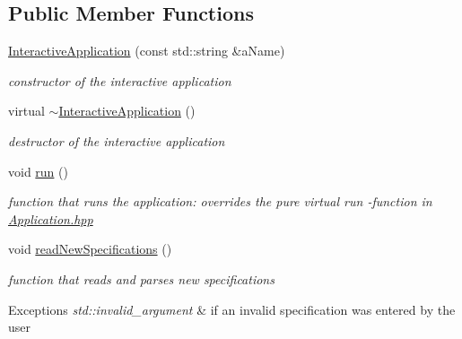 \subsection*{Public Member Functions}
\begin{DoxyCompactItemize}
\item 
\hyperlink{classInteractiveApplication_a400252d4a0553cc7fb85106106341fe9}{Interactive\+Application} (const std\+::string \&a\+Name)\hypertarget{classInteractiveApplication_a400252d4a0553cc7fb85106106341fe9}{}\label{classInteractiveApplication_a400252d4a0553cc7fb85106106341fe9}

\begin{DoxyCompactList}\small\item\em constructor of the interactive application \end{DoxyCompactList}\item 
virtual \hyperlink{classInteractiveApplication_adebc1def706d551144ab3f40511f85eb}{$\sim$\+Interactive\+Application} ()\hypertarget{classInteractiveApplication_adebc1def706d551144ab3f40511f85eb}{}\label{classInteractiveApplication_adebc1def706d551144ab3f40511f85eb}

\begin{DoxyCompactList}\small\item\em destructor of the interactive application \end{DoxyCompactList}\item 
void \hyperlink{classInteractiveApplication_ae77593fe90fa4fae53dc8ca84ba1a239}{run} ()\hypertarget{classInteractiveApplication_ae77593fe90fa4fae53dc8ca84ba1a239}{}\label{classInteractiveApplication_ae77593fe90fa4fae53dc8ca84ba1a239}

\begin{DoxyCompactList}\small\item\em function that runs the application\+: overrides the pure virtual run -\/function in \hyperlink{Application_8hpp_source}{Application.\+hpp} \end{DoxyCompactList}\item 
void \hyperlink{classInteractiveApplication_a8fb03895eb606ec5b984b5f0d10aca53}{read\+New\+Specifications} ()\hypertarget{classInteractiveApplication_a8fb03895eb606ec5b984b5f0d10aca53}{}\label{classInteractiveApplication_a8fb03895eb606ec5b984b5f0d10aca53}

\begin{DoxyCompactList}\small\item\em function that reads and parses new specifications 
\begin{DoxyExceptions}{Exceptions}
{\em std\+::invalid\+\_\+argument} & if an invalid specification was entered by the user \\
\hline
\end{DoxyExceptions}
\end{DoxyCompactList}\end{DoxyCompactItemize}

